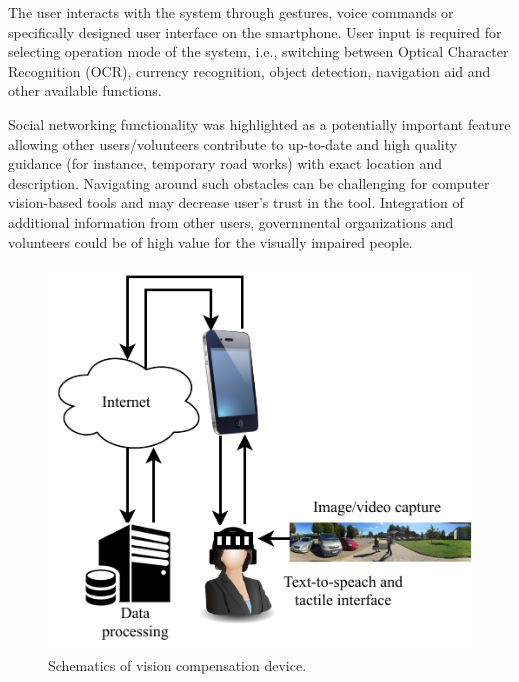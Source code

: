 \documentclass[10pt,conference,compsocconf]{IEEEtran}
\begin{document}
The user interacts with the system through gestures, voice commands or specifically designed user interface on the smartphone. User input is required for selecting operation mode of the system, i.e., switching between Optical Character Recognition (OCR), currency recognition, object detection, navigation aid and other available functions. 

Social networking functionality was highlighted as a potentially important feature allowing other users/volunteers contribute to up-to-date and high quality guidance (for instance, temporary road works) with exact location and description. Navigating around such obstacles can be challenging for computer vision-based tools and may decrease user's trust in the tool. Integration of additional information from other users, governmental organizations and volunteers could be of high value for the visually impaired people.

\begin{figure}
  \begin{center}
    \includegraphics[scale=1.0]{./img/cropped_diagram.pdf}  
  \end{center}
  \caption{Schematics of vision compensation device.}
  \label{fig:schematics}
\end{figure}
\end{document}
